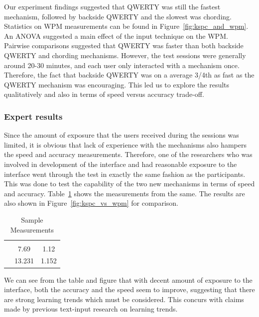 Our experiment findings suggested that QWERTY was still the fastest
mechanism, followed by backside QWERTY and the slowest was
chording. Statistics on WPM measurements can be found in
Figure~\ref{fig:kspc_and_wpm}. An ANOVA suggested a main effect of the input technique on the WPM. Pairwise comparisons suggested that QWERTY was faster than both backside QWERTY
and chording mechanisms. However, the test sessions were generally around 20-30 minutes, and each user only interacted with a mechanism once. Therefore, the fact that backside
QWERTY was on a average 3/4th as fast as the QWERTY mechanism was
encouraging. This led us to explore the results qualitatively and also
in terms of speed versus accuracy trade-off.


\subsubsection{Expert results}

Since the amount of exposure that the users received during the sessions was limited, it is obvious that lack of experience with the mechanisms also hampers the speed and accuracy measurements. Therefore, one of the researchers who was involved in development of the interface and had reasonable exposure to the interface went through the test in exactly the same fashion as the participants. This was done to test the capability of the two new mechanisms in terms of speed and accuracy. Table~\ref{tab:StatisticsForTestCorpora} shows the measurements from the same.  The results are also shown in Figure~\ref{fig:kspc_vs_wpm} for comparison.

\begin{table}
	\centering
		\begin{tabular}{rcc} 
		                         & \color{grey}{WPM}    & \color{grey}{KSPC} \\ 
                   \color{grey}{Chording} & 7.69   & 1.12 \\ 
                   \color{grey}{Back-of-device QWERTY} & 13.231 & 1.152 \\ 
		\end{tabular}
	\caption{Sample Measurements}
	\label{tab:StatisticsForTestCorpora}
\end{table}

We can see from the table and figure that with decent amount of
exposure to the interface, both the accuracy and the speed seem to
improve, suggesting that there are strong learning trends which must
be considered. This concurs with claims made by previous text-input research on learning trends. \cite{LetterWise} 

